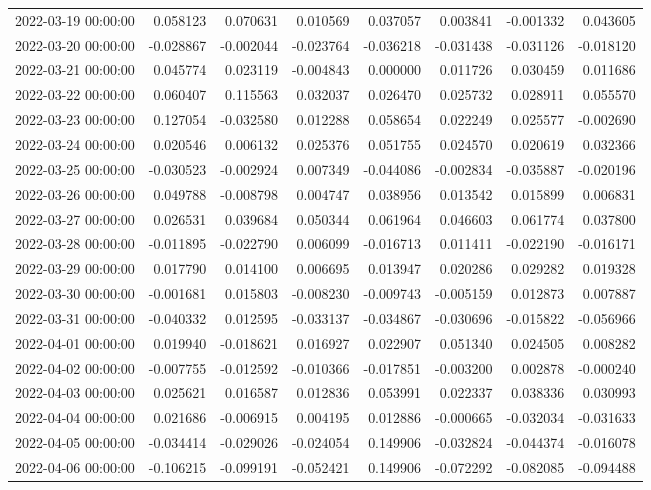\begin{tabular}{lrrrrrrr}
2022-03-19 00:00:00 & 0.058123 & 0.070631 & 0.010569 & 0.037057 & 0.003841 & -0.001332 & 0.043605 \\
2022-03-20 00:00:00 & -0.028867 & -0.002044 & -0.023764 & -0.036218 & -0.031438 & -0.031126 & -0.018120 \\
2022-03-21 00:00:00 & 0.045774 & 0.023119 & -0.004843 & 0.000000 & 0.011726 & 0.030459 & 0.011686 \\
2022-03-22 00:00:00 & 0.060407 & 0.115563 & 0.032037 & 0.026470 & 0.025732 & 0.028911 & 0.055570 \\
2022-03-23 00:00:00 & 0.127054 & -0.032580 & 0.012288 & 0.058654 & 0.022249 & 0.025577 & -0.002690 \\
2022-03-24 00:00:00 & 0.020546 & 0.006132 & 0.025376 & 0.051755 & 0.024570 & 0.020619 & 0.032366 \\
2022-03-25 00:00:00 & -0.030523 & -0.002924 & 0.007349 & -0.044086 & -0.002834 & -0.035887 & -0.020196 \\
2022-03-26 00:00:00 & 0.049788 & -0.008798 & 0.004747 & 0.038956 & 0.013542 & 0.015899 & 0.006831 \\
2022-03-27 00:00:00 & 0.026531 & 0.039684 & 0.050344 & 0.061964 & 0.046603 & 0.061774 & 0.037800 \\
2022-03-28 00:00:00 & -0.011895 & -0.022790 & 0.006099 & -0.016713 & 0.011411 & -0.022190 & -0.016171 \\
2022-03-29 00:00:00 & 0.017790 & 0.014100 & 0.006695 & 0.013947 & 0.020286 & 0.029282 & 0.019328 \\
2022-03-30 00:00:00 & -0.001681 & 0.015803 & -0.008230 & -0.009743 & -0.005159 & 0.012873 & 0.007887 \\
2022-03-31 00:00:00 & -0.040332 & 0.012595 & -0.033137 & -0.034867 & -0.030696 & -0.015822 & -0.056966 \\
2022-04-01 00:00:00 & 0.019940 & -0.018621 & 0.016927 & 0.022907 & 0.051340 & 0.024505 & 0.008282 \\
2022-04-02 00:00:00 & -0.007755 & -0.012592 & -0.010366 & -0.017851 & -0.003200 & 0.002878 & -0.000240 \\
2022-04-03 00:00:00 & 0.025621 & 0.016587 & 0.012836 & 0.053991 & 0.022337 & 0.038336 & 0.030993 \\
2022-04-04 00:00:00 & 0.021686 & -0.006915 & 0.004195 & 0.012886 & -0.000665 & -0.032034 & -0.031633 \\
2022-04-05 00:00:00 & -0.034414 & -0.029026 & -0.024054 & 0.149906 & -0.032824 & -0.044374 & -0.016078 \\
2022-04-06 00:00:00 & -0.106215 & -0.099191 & -0.052421 & 0.149906 & -0.072292 & -0.082085 & -0.094488 \\

\end{tabular}
